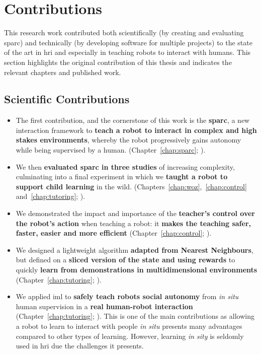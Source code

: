 \section{Contributions}\label{sec:intro_contr}

This research work contributed both scientifically (by creating and evaluating \gls{sparc}) and technically (by developing software for multiple projects) to the state of the art in \gls{hri} and especially in teaching robots to interact with humans. This section highlights the original contribution of this thesis and indicates the relevant chapters and published work.

\subsection{Scientific Contributions}

\begin{itemize}
	\item The first contribution, and the cornerstone of this work is the \textbf{\acrfull{sparc}}, a new interaction framework to \textbf{teach a robot to interact in complex and high stakes environments}, whereby the robot progressively gains autonomy while being supervised by a human. (Chapter~\ref{chap:sparc}; \citealt{senft2015human,senft2015sparc}).
	\item We then \textbf{evaluated \gls{sparc} in three studies} of increasing complexity, culminating into a final experiment in which we \textbf{taught a robot to support child learning} in the wild. (Chapters~\ref{chap:woz},~\ref{chap:control} and~\ref{chap:tutoring}; \citealt{senft2015sparc,senft2017supervised,senft2018robots}).
	\item We demonstrated the impact and importance of the \textbf{teacher's control over the robot's action} when teaching a robot: it \textbf{makes the teaching safer, faster, easier and more efficient} (Chapter~\ref{chap:control}; \citealt{senft2016sparc,senft2017supervised}).
	\item We designed a lightweight algorithm \textbf{adapted from Nearest Neighbours}, but defined on a \textbf{sliced version of the state and using rewards} to quickly \textbf{learn from demonstrations in multidimensional environments} (Chapter~\ref{chap:tutoring}; \citealt{senft2017toward}).
	\item We applied \acrlong{iml} to \textbf{safely teach robots social autonomy} from \textit{in situ} human supervision in a \textbf{real human-robot interaction} (Chapter~\ref{chap:tutoring}; \citealt{senft2018robots}). This is one of the main contributions as allowing a robot to learn to interact with people \textit{in situ} presents many advantages compared to other types of learning. However, learning \emph{in sity} is seldomly used in \gls{hri} due the challenges it presents.
\end{itemize}

